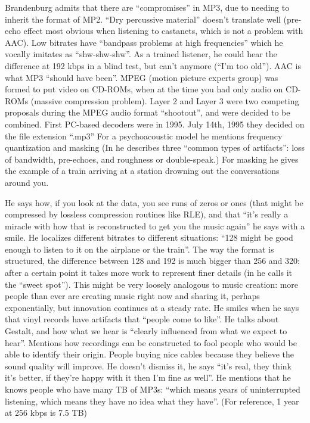 \documentclass{thesis}
\begin{document}
Brandenburg admits that there are ``compromises'' in MP3, due to needing to inherit the format of MP2. ``Dry percussive material'' doesn't translate well (pre-echo effect most obvious when listening to castanets, which is not a problem with AAC). Low bitrates have ``bandpass problems at high frequencies'' which he vocally imitates as ``shw-shw-shw''. As a trained listener, he could hear the difference at 192 kbps in a blind test, but can't anymore (``I'm too old''). AAC is what MP3 ``should have been''. MPEG (motion picture experts group) was formed to put video on CD-ROMs, when at the time you had only audio on CD-ROMs (massive compression problem). Layer 2 and Layer 3 were two competing proposals during the MPEG audio format ``shootout'', and were decided to be combined. First PC-based decoders were in 1995. July 14th, 1995 they decided on the file extension ``.mp3'' For a psychoacoustic model he mentions frequency quantization and masking (In \cite{karlheinz_brandenburg_mp3_1999} he describes three ``common types of artifacts'': loss of bandwidth, pre-echoes, and roughness or double-speak.) For masking he gives the example of a train arriving at a station drowning out the conversations around you.

He says how, if you look at the data, you see runs of zeros or ones (that might be compressed by lossless compression routines like RLE), and that ``it's really a miracle with how that is reconstructed to get you the music again'' he says with a smile. He localizes different bitrates to different situations: ``128 might be good enough to listen to it on the airplane or the train''. The way the format is structured, the difference between 128 and 192 is much bigger than 256 and 320: after a certain point it takes more work to represent finer details (in \cite[9]{karlheinz_brandenburg_mp3_1999} he calls it the ``sweet spot''). This might be very loosely analogous to music creation: more people than ever are creating music right now and sharing it, perhaps exponentially, but innovation continues at a steady rate. He smiles when he says that vinyl records have artifacts that ``people come to like''. He talks about Gestalt, and how what we hear is ``clearly influenced from what we expect to hear''. Mentions how recordings can be constructed to fool people who would be able to identify their origin. People buying nice cables because they believe the sound quality will improve. He doesn't dismiss it, he says ``it's real, they think it's better, if they're happy with it then I'm fine as well''. He mentions that he knows people who have many TB of MP3s: ``which means years of uninterrupted listening, which means they have no idea what they have''. (For reference, 1 year at 256 kbps is 7.5 TB) \cite{tom_merritt_real_2010}
\end{document}
